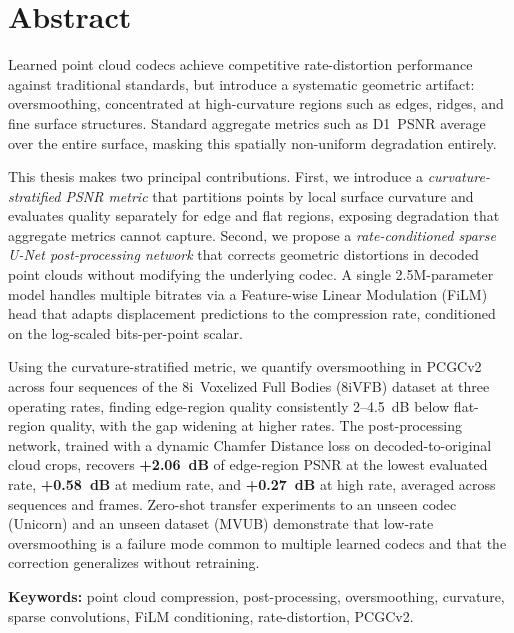 \chapter*{Abstract}

Learned point cloud codecs achieve competitive rate-distortion performance
against traditional standards, but introduce a systematic geometric artifact:
oversmoothing, concentrated at high-curvature regions such as edges, ridges,
and fine surface structures. Standard aggregate metrics such as D1~PSNR average
over the entire surface, masking this spatially non-uniform degradation entirely.

This thesis makes two principal contributions.
First, we introduce a \emph{curvature-stratified PSNR metric} that partitions
points by local surface curvature and evaluates quality separately for edge and
flat regions, exposing degradation that aggregate metrics cannot capture.
Second, we propose a \emph{rate-conditioned sparse U-Net post-processing network}
that corrects geometric distortions in decoded point clouds without modifying the
underlying codec.
A single 2.5M-parameter model handles multiple bitrates via a Feature-wise
Linear Modulation (FiLM) head that adapts displacement predictions to the
compression rate, conditioned on the log-scaled bits-per-point scalar.

Using the curvature-stratified metric, we quantify oversmoothing in PCGCv2
across four sequences of the 8i~Voxelized Full Bodies (8iVFB) dataset at three
operating rates, finding edge-region quality consistently 2--4.5~dB below
flat-region quality, with the gap widening at higher rates.
The post-processing network, trained with a dynamic Chamfer Distance loss on
decoded-to-original cloud crops, recovers \textbf{+2.06~dB} of edge-region PSNR
at the lowest evaluated rate, \textbf{+0.58~dB} at medium rate, and
\textbf{+0.27~dB} at high rate, averaged across sequences and frames.
Zero-shot transfer experiments to an unseen codec (Unicorn) and an unseen
dataset (MVUB) demonstrate that low-rate oversmoothing is a failure mode
common to multiple learned codecs and that the correction generalizes without
retraining.

\vspace{1em}
\noindent\textbf{Keywords:}
point cloud compression, post-processing, oversmoothing, curvature,
sparse convolutions, FiLM conditioning, rate-distortion, PCGCv2.

\cleardoublepage
